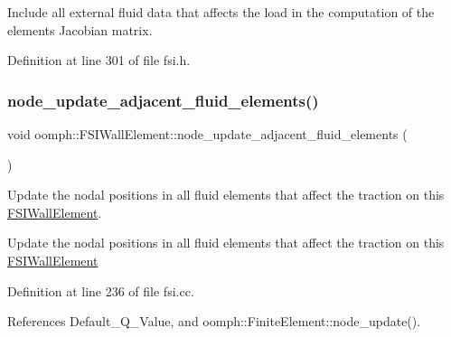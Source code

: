 Include all external fluid data that affects the load in the computation of the element\textquotesingle{}s Jacobian matrix. 



Definition at line 301 of file fsi.\+h.

\mbox{\label{classoomph_1_1FSIWallElement_aec47fc9fff885241c68533df8125e0a0}} 
\subsubsection{\texorpdfstring{node\+\_\+update\+\_\+adjacent\+\_\+fluid\+\_\+elements()}{node\_update\_adjacent\_fluid\_elements()}}
{\footnotesize\ttfamily void oomph\+::\+F\+S\+I\+Wall\+Element\+::node\+\_\+update\+\_\+adjacent\+\_\+fluid\+\_\+elements (\begin{DoxyParamCaption}{ }\end{DoxyParamCaption})}



Update the nodal positions in all fluid elements that affect the traction on this \hyperlink{classoomph_1_1FSIWallElement}{F\+S\+I\+Wall\+Element}. 

Update the nodal positions in all fluid elements that affect the traction on this \hyperlink{classoomph_1_1FSIWallElement}{F\+S\+I\+Wall\+Element} 

Definition at line 236 of file fsi.\+cc.



References Default\+\_\+\+Q\+\_\+\+Value, and oomph\+::\+Finite\+Element\+::node\+\_\+update().

\mbox{\label{classoomph_1_1FSIWallElement_a5ba035695fb6a51b65280779ff65277b}} 
